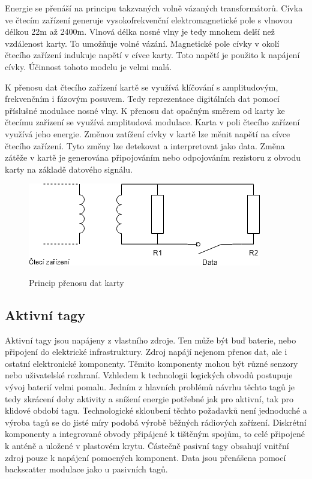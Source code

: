 Energie se přenáší na principu takzvaných volně vázaných transformátorů. Cívka ve čtecím zařízení generuje vysokofrekvenční elektromagnetické pole s vlnovou délkou 22m až 2400m. Vlnová délka nosné vlny je tedy mnohem delší než vzdálenost karty. To umožňuje volné vázání. Magnetické pole cívky v okolí čtecího zařízení indukuje napětí v cívce karty. Toto napětí je použito k napájení cívky. Účinnost tohoto modelu je velmi malá.\cite{Smart_card_handbook}\par
K přenosu dat čtecího zařízení kartě se využívá klíčování s amplitudovým, frekvenčním i fázovým posuvem. Tedy reprezentace digitálních dat pomocí příslušné modulace nosné vlny. K přenosu dat opačným směrem od karty ke čtecímu zařízení se využívá amplitudová modulace. Karta v poli čtecího zařízení využívá jeho energie. Změnou zatížení cívky v kartě lze měnit napětí na cívce čtecího zařízení. Tyto změny lze detekovat a interpretovat jako data. Změna zátěže v kartě je generována připojováním nebo odpojováním rezistoru z obvodu karty na základě datového signálu.\cite{Smart_card_handbook}\par

\begin{figure}[ht]\centering
  \centering
  \includegraphics[width=0.7\linewidth]{obrazky-figures/obrazekRFIDDataTransfer.png}\\[1pt]  
  \caption{Princip přenosu dat karty}    
  \label{obrazekRfidPrincipPřenosuDat}
\end{figure}

\subsection{Aktivní tagy} 
Aktivní tagy jsou napájeny z vlastního zdroje. Ten může být buď baterie, nebo připojení do elektrické infrastruktury. Zdroj napájí nejenom přenos dat, ale i ostatní elektronické komponenty. Těmito komponenty mohou být různé senzory nebo uživatelské rozhraní\cite{RFID_explained}. Vzhledem k technologii logických obvodů postupuje vývoj baterií velmi pomalu. Jedním z hlavních problémů návrhu těchto tagů je tedy zkrácení doby aktivity a snížení energie potřebné jak pro aktivní, tak pro klidové období tagu. Technologické skloubení těchto požadavků není jednoduché a výroba tagů se do jisté míry podobá výrobě běžných rádiových zařízení. Diskrétní komponenty a integrované obvody připájené k tištěným spojům, to celé připojené k anténě a uložené v plastovém krytu\cite{The_RF_in_RFID}. 
Částečně pasivní tagy obsahují vnitřní zdroj pouze k napájení pomocných komponent. Data jsou přenášena pomocí backscatter modulace jako u pasivních tagů\cite{Survey_of_RFID_Tags}.


